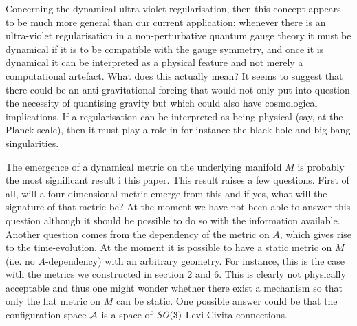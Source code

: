 \documentclass[letterpaper,12pt]{article}
\def\ca{{\cal A}}
\def\cf{{\cal F}}
\begin{document}
Concerning the dynamical ultra-violet regularisation, then this concept appears to be much more general than our current application: whenever there is an ultra-violet regularisation in a non-perturbative quantum gauge theory it must be dynamical if it is to be compatible with the gauge symmetry, and once it is dynamical it can be interpreted as a physical feature and not merely a computational artefact. What does this actually mean? It seems to suggest that there could be an anti-gravitational forcing that would not only put into question the necessity of quantising gravity but which could also have cosmological implications. If a regularisation can be interpreted as being physical (say, at the Planck scale), then it must play a role in for instance the black hole and big bang singularities. %


The emergence of a dynamical metric on the underlying manifold $M$ is probably the most significant result i this paper. This result raises a few questions. First of all, will a four-dimensional metric emerge from this and if yes, what will the signature of that metric be? At the moment we have not been able to answer this question although it should be possible to do so with the information available. Another question comes from the dependency of the metric on $A$, which gives rise to the time-evolution. At the moment it is possible to have a static metric on $M$ (i.e. no $A$-dependency) with an arbitrary geometry. For instance, this is the case with the metrics we constructed in section 2 and 6. This is clearly not physically acceptable and thus one might wonder whether there exist a mechanism so that only the flat metric on $M$ can be static. One possible answer could be that the configuration space $\ca$ is a space of $\SO3$ Levi-Civita connections.


\end{document}
